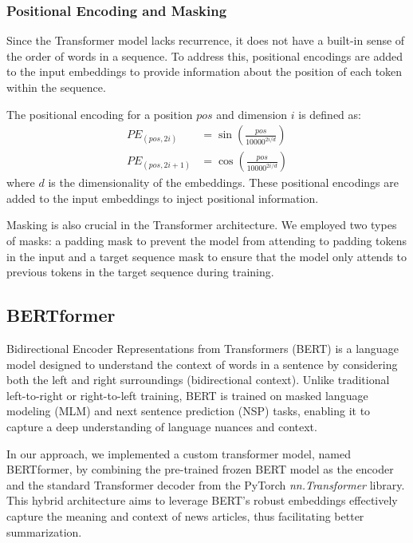\subsubsection{Positional Encoding and Masking}

Since the Transformer model lacks recurrence, it does not have a built-in sense of the order of words in a sequence. To address this, positional encodings are added to the input embeddings to provide information about the position of each token within the sequence.

The positional encoding for a position \(pos\) and dimension \(i\) is defined as:
\begin{equation}
	\begin{aligned}
		PE_{(pos, 2i)} &= \sin\left(\frac{pos}{10000^{2i/d}}\right) \\
		PE_{(pos, 2i+1)} &= \cos\left(\frac{pos}{10000^{2i/d}}\right)
	\end{aligned}
\end{equation}
where \(d\) is the dimensionality of the embeddings. These positional encodings are added to the input embeddings to inject positional information.

Masking is also crucial in the Transformer architecture. We employed two types of masks: a padding mask to prevent the model from attending to padding tokens in the input and a target sequence mask to ensure that the model only attends to previous tokens in the target sequence during training.


\subsection{BERTformer}
Bidirectional Encoder Representations from Transformers (BERT) \cite{devlin2018bert} is a language model designed to understand the context of words in a sentence by considering both the left and right surroundings (bidirectional context). Unlike traditional left-to-right or right-to-left training, BERT is trained on masked language modeling (MLM) and next sentence prediction (NSP) tasks, enabling it to capture a deep understanding of language nuances and context.

In our approach, we implemented a custom transformer model, named BERTformer, by combining the pre-trained frozen BERT model as the encoder and the standard Transformer decoder from the PyTorch \textit{nn.Transformer} library. This hybrid architecture aims to leverage BERT's robust embeddings effectively capture the meaning and context of news articles, thus facilitating better summarization.

